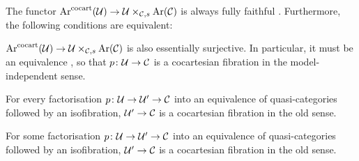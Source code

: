 \begin{lem}\label{lem:CocartesianModelIndependent}
	The functor $\operatorname{Ar}^{\mathrm{cocart}}(\mathcal{U})\rightarrow \mathcal{U}\times_{\mathcal{C},s}\operatorname{Ar}(\mathcal{C})$ is always fully faithful . Furthermore, the following conditions are equivalent:
	\begin{alphanumerate}
		\item $\operatorname{Ar}^{\mathrm{cocart}}(\mathcal{U})\rightarrow \mathcal{U}\times_{\mathcal{C},s}\operatorname{Ar}(\mathcal{C})$ is also essentially surjective. In particular, it must be an equivalence , so that $p\colon \mathcal{U}\rightarrow \mathcal{C}$ is a cocartesian fibration in the model-independent sense.\label{enum:CocartesianModelIndependent}
		\item For every factorisation $p\colon \mathcal{U}\rightarrow \mathcal{U}'\rightarrow \mathcal{C}$ into an equivalence of quasi-categories followed by an isofibration, $\mathcal{U}'\rightarrow \mathcal{C}$ is a cocartesian fibration in the old sense.\label{enum:CocartesianAllFactorisations}
		\item For some factorisation $p\colon \mathcal{U}\rightarrow \mathcal{U}'\rightarrow \mathcal{C}$ into an equivalence of quasi-categories followed by an isofibration, $\mathcal{U}'\rightarrow \mathcal{C}$ is a cocartesian fibration in the old sense.\label{enum:CocartesianSomeFactorisations}
	\end{alphanumerate}
\end{lem}

